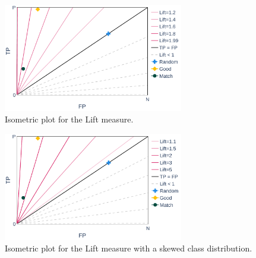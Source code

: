 \begin{figure}[ht]
    \centering
    \includegraphics[width=0.7\textwidth]{Figures/MP-Lift}
		\caption{Isometric plot for the Lift measure.}
    \label{fig:lift}
\end{figure}
\begin{figure}[ht]
    \centering
    \includegraphics[width=0.7\textwidth]{Figures/MP-Lift-bias}
		\caption{Isometric plot for the Lift measure with a skewed class distribution.}
    \label{fig:lift-bias}
\end{figure}


\FloatBarrier



